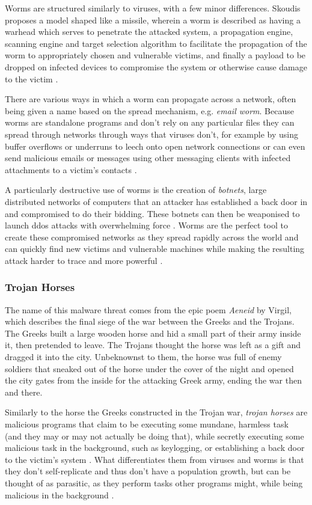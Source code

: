 Worms are structured similarly to viruses, with a few minor differences. Skoudis proposes a model shaped like a missile,
wherein a worm is described as having a warhead which serves to penetrate the attacked system, a propagation engine,
scanning engine and target selection algorithm to facilitate the propagation of the worm to appropriately chosen and
vulnerable victims, and finally a payload to be dropped on infected devices to compromise the system or otherwise cause
damage to the victim \cite{skoudis-book}.

There are various ways in which a worm can propagate across a network, often being given a name based on the spread 
mechanism, e.g. \emph{email worm}. Because worms are standalone programs and don't rely on any particular files they can
spread through networks through ways that viruses don't, for example by using buffer overflows or underruns to leech
onto open network connections or can even send malicious emails or messages using other messaging clients with infected 
attachments to a victim's contacts \cite{skoudis-book, aycock-book}.

A particularly destructive use of worms is the creation of \emph{botnets}, large distributed networks of computers that
an attacker has established a back door in and compromised to do their bidding. These botnets can then be weaponised to
launch \acrfull{ddos} attacks with overwhelming force \cite{skoudis-book}. Worms are the perfect tool to create these
compromised networks as they spread rapidly across the world and can quickly find new victims and vulnerable machines
while making the resulting attack harder to trace and more powerful \cite{skoudis-book}.

\subsubsection{Trojan Horses}
The name of this malware threat comes from the epic poem \emph{Aeneid} by Virgil, which describes the final siege of the 
war between the Greeks and the Trojans. The Greeks built a large wooden horse and hid a small part of their army inside
it, then pretended to leave. The Trojans thought the horse was left as a gift and dragged it into the city. Unbeknownst
to them, the horse was full of enemy soldiers that sneaked out of the horse under the cover of the night and opened the
city gates from the inside for the attacking Greek army, ending the war then and there.

Similarly to the horse the Greeks constructed in the Trojan war, \emph{trojan horses} are malicious programs that
claim to be executing some mundane, harmless task (and they may or may not actually be doing that), while secretly 
executing some malicious task in the background, such as keylogging, or establishing a back door to the victim's system 
\cite[p.~12-13]{viruses-revealed-book, aycock-book}. 
What differentiates them from viruses and worms is that they don't self-replicate and thus don't have a population growth, 
but can be thought of as parasitic, as they perform tasks other programs might, while being malicious in the background 
\cite[p.~12]{aycock-book}. 

